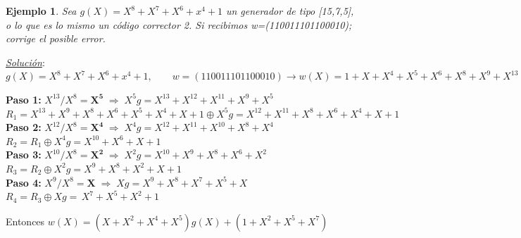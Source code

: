 \documentclass{beamer}
\theoremstyle{plain}
\theoremstyle{example}
\theoremstyle{example}
\newtheorem{ejemplo} [Ejemplo] {Ejemplo}
\begin{document}
\begin{frame}  \footnotesize
\begin{ejemplo}

Sea $g(X) = X^8 + X^7+ X^6+ x^4+ 1$ un generador de tipo [15,7,5], o lo que es lo mismo un código corrector 2. Si recibimos w=(110011101100010); corrige el posible error.


\end{ejemplo}
 \textit{\underline{Solución}}:\\ 

 $ g(X) = X^8 + X^7+ X^6+ x^4+ 1, \qquad 
w=(110011101100010) \rightarrow w(X)= 1+X+X^4+X^5+X^6+X^8+X^9+X^{13}$
    
\vspace{0.3cm}
\textbf{Paso 1: } $ X^{13} / X^8 =\mathbf{X^5} \;\Rightarrow\; X^{5}g = X^{13}+X^{12}+X^{11}+X^{9}+X^{5}$
\\
$R_1 = X^{13}+X^{9}+X^{8}+X^{6}+X^{5}+X^{4}+X+1  \oplus X^{5}g = X^{12}+X^{11}+X^{8}+X^{6}+X^{4}+X+1$ \\[6pt]


\textbf{Paso 2: } $X^{12}/X^{8}= \mathbf{X^4} \;\Rightarrow\;
X^{4}g = X^{12}+X^{11}+X^{10}+X^{8}+X^{4}$ \\
$R_2 = R_1 \oplus X^{4}g
     = X^{10}+X^{6}+X+1$ \\[6pt]


\textbf{Paso 3: } $X^{10} / X^8=\mathbf{X^2} \;\Rightarrow\;
X^{2}g = X^{10}+X^{9}+X^{8}+X^{6}+X^{2}$ \\
$R_3 = R_2 \oplus X^{2}g
     = X^{9}+X^{8}+X^{2}+X+1$ \\[6pt]
     
\textbf{Paso 4: }  $X^9 / X^8= \mathbf{X}
\;\Rightarrow\;
Xg = X^{9}+X^{8}+X^{7}+X^{5}+X $\\
$R_4 = R_3 \oplus Xg
     = \boxed{\,X^{7}+X^{5}+X^{2}+1\,}$

\vspace{0.3cm}

Entonces $w(X)= (X+X^2+X^4+X^5) g(X)+ (1+X^2+X^5+X^7)$


\end{frame} 
\end{document}
